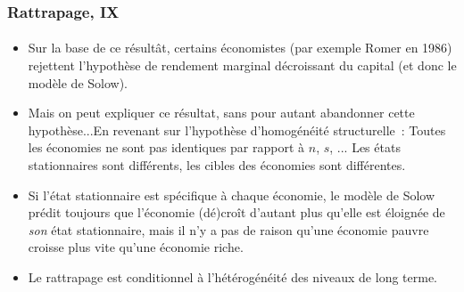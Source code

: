 \documentclass[10pt,notheorems]{beamer}
\theoremstyle{plain}
\theoremstyle{definition} %
\begin{document}
\begin{frame}
  \frametitle{Rattrapage, IX}
  \framesubtitle{}

  \begin{itemize}

  \item Sur la base de ce résultât, certains économistes (par exemple Romer en
    1986) rejettent l'hypothèse de rendement marginal décroissant du capital (et
    donc le modèle de Solow).\newline

  \item Mais on peut expliquer ce résultat, sans pour autant
    abandonner cette hypothèse...En revenant sur l'hypothèse d'homogénéité structurelle~: Toutes
    les économies ne sont pas identiques par rapport à $n$, $s$, ... Les états
    stationnaires sont différents, les cibles des économies sont différentes.\newline

  \item Si l'état stationnaire est spécifique à chaque économie, le modèle de
    Solow prédit toujours que l'économie (dé)croît d'autant plus qu'elle est
    éloignée de \emph{son} état stationnaire, mais il n'y a pas de raison qu'une
    économie pauvre croisse plus vite qu'une économie riche.\newline

  \item Le rattrapage est conditionnel à l'hétérogénéité des niveaux de long terme.

  \end{itemize}

\end{frame}
\end{document}
